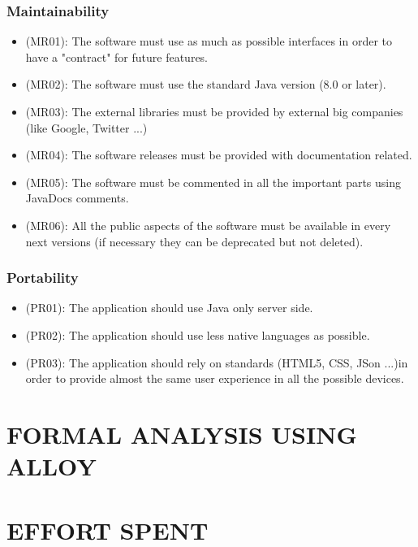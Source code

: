 \documentclass[a4paper,leqno]{book}
\begin{document}
\subsection{Maintainability}
\begin{itemize}
\item (MR01): The software must use as much as possible interfaces in order to have a "contract" for future features.
\item (MR02): The software must use the standard Java version (8.0 or later).
\item (MR03): The external libraries must be provided by external big companies (like Google, Twitter ...)
\item (MR04): The software releases must be provided with documentation related.
\item (MR05): The software must be commented in all the important parts using JavaDocs comments.
\item (MR06): All the public aspects of the software must be available in every next versions (if necessary they can be deprecated but not deleted).
\end{itemize}

\subsection{Portability}
\begin{itemize}
\item (PR01): The application should use Java only server side.
\item (PR02): The application should use less native languages as possible.
\item (PR03): The application should rely on standards (HTML5, CSS, JSon ...)in order to provide almost the same user experience in all the possible devices.
\end{itemize}

\chapter{FORMAL ANALYSIS USING ALLOY}

\chapter{EFFORT SPENT}
\end{document}
